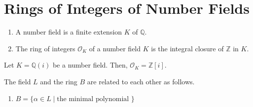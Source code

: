 \section{Rings of Integers of Number Fields}
\begin{definition}
    \begin{enumerate}
        \item A {\color{maththen}number field} is a {\color{mathif}finite extension} \(K\) of \(\mathbb{Q}\).
        \item The {\color{maththen}ring of integers} \(\mathcal{O}_K\) of a number field \(K\) is the {\color{mathif}integral closure} of \(\mathbb{Z}\) in \(K\).
    \end{enumerate}
\end{definition}
\begin{example}
    Let \(K = \mathbb{Q}(i)\) be a number field. Then, \(\mathcal{O}_K = \mathbb{Z}[i]\).
\end{example}
\begin{proposition}
    The field \(L\) and the ring \(B\) are related to each other as follows.
    \begin{enumerate}
        \item \(B = \{\alpha \in L \mid \text{the minimal polynomial }\}\)
    \end{enumerate}
\end{proposition}